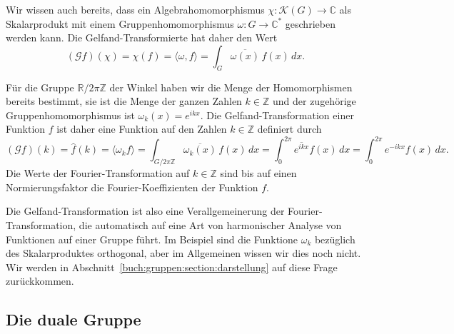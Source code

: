 Wir wissen auch bereits, dass ein Algebrahomomorphismus
$\chi\colon \mathscr{K}(G)\to\mathbb{C}$ als Skalarprodukt mit
einem Gruppenhomomorphismus 
$\omega\colon G\to\mathbb{C}^*$ geschrieben werden kann.
Die Gelfand-Transformierte hat daher den Wert
\[
(\mathscr{G}f)(\chi)
=
\chi(f)
=
\langle \omega ,f\rangle
=
\int_G \overline{\omega(x)}\,f(x)\,dx.
\]

\begin{beispiel}
Für die Gruppe $\mathbb{R}/2\pi\mathbb{Z}$ der Winkel haben wir die
Menge der Homomorphismen bereits bestimmt, sie ist die Menge der
ganzen Zahlen $k\in\mathbb{Z}$ und der zugehörige Gruppenhomomorphismus
ist $\omega_k(x) = e^{ikx}$.
Die Gelfand-Transformation einer Funktion $f$ ist daher eine Funktion
auf den Zahlen $k\in \mathbb{Z}$ definiert durch
\[
(\mathscr{G}f)(k)
=
\hat{f}(k)
=
\langle \omega_k f\rangle
=
\int_{G/2\pi \mathbb{Z}} \overline{\omega_k(x)}\, f(x) \,dx
=
\int_0^{2\pi} \overline{e^{ikx}} f(x)\,dx
=
\int_0^{2\pi} e^{-ikx} f(x)\,dx.
\]
Die Werte der Fourier-Transformation auf $k\in\mathbb{Z}$ sind bis auf einen
Normierungsfaktor die Fourier-Koeffizienten der Funktion $f$.
\end{beispiel}

Die Gelfand-Transformation ist also eine Verallgemeinerung der
Fourier-Transformation, die automatisch auf eine Art von harmonischer
Analyse von Funktionen auf einer Gruppe führt.
Im Beispiel sind die Funktione $\omega_k$ bezüglich des
Skalarproduktes orthogonal, aber im Allgemeinen wissen wir dies 
noch nicht.
Wir werden in Abschnitt~\ref{buch:gruppen:section:darstellung}
auf diese Frage zurückkommen.



%
%
\subsection{Die duale Gruppe}


